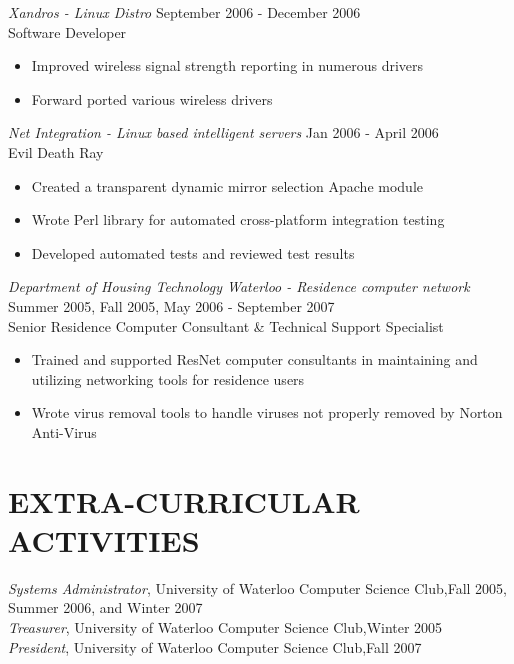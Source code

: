 \documentclass[10pt,line,margin=0.1]{newsres}
\begin{document}
\begin{resume}
        {\sl Xandros - Linux Distro} \hfill September 2006 - December 2006 \\
        Software Developer
        \begin{itemize}  \itemsep -2pt %
        \item{Improved wireless signal strength reporting in numerous drivers}
        \item{Forward ported various wireless drivers}
        \end{itemize}
        {\sl Net Integration - Linux based intelligent servers} \hfill Jan 2006 - April 2006 \\
        Evil Death Ray
        \begin{itemize}  \itemsep -2pt %
        \item{Created a transparent dynamic mirror selection Apache module}
        \item{Wrote Perl library for automated cross-platform integration testing}
        \item{Developed automated tests and reviewed test results}
        \end{itemize}
        {\sl Department of Housing Technology Waterloo - Residence computer network} \hfill Summer 2005, Fall 2005, May 2006 - September 2007 \\
        Senior Residence Computer Consultant \& Technical Support Specialist
        \begin{itemize} \itemsep -2pt %
        \item{Trained and supported ResNet computer consultants in maintaining and utilizing networking tools for residence users}
        \item{Wrote virus removal tools to handle viruses not properly removed by Norton Anti-Virus}
        \end{itemize}

 
\section{EXTRA-CURRICULAR \\ ACTIVITIES}             
        {\it Systems Administrator}, University of Waterloo Computer Science Club,\hfill  Fall 2005, Summer 2006, and Winter 2007 \\
        {\it Treasurer}, University of Waterloo Computer Science Club,\hfill Winter 2005 \\
        {\it President}, University of Waterloo Computer Science Club,\hfill Fall 2007 \\


\end{resume}
\end{document}
